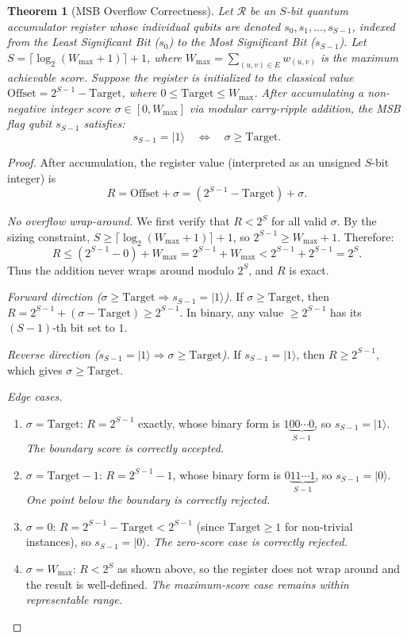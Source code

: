 \documentclass{ieeeaccess}
\newtheorem{theorem}{Theorem}
\begin{document}
\begin{theorem}[MSB Overflow Correctness]
\label{thm:overflow}
Let $\mathcal{R}$ be an $S$-bit quantum accumulator register whose individual qubits are denoted $s_0, s_1, \dots, s_{S-1}$, indexed from the Least Significant Bit ($s_0$) to the Most Significant Bit ($s_{S-1}$). Let $S = \lceil \log_2(W_{\max} + 1) \rceil + 1$, where $W_{\max} = \sum_{(u,v) \in E} w_{(u,v)}$ is the maximum achievable score. Suppose the register is initialized to the classical value $\mathrm{Offset} = 2^{S-1} - \mathrm{Target}$, where $0 \le \mathrm{Target} \le W_{\max}$. After accumulating a non-negative integer score $\sigma \in [0, W_{\max}]$ via modular carry-ripple addition, the MSB flag qubit $s_{S-1}$ satisfies:
\[
s_{S-1} = |1\rangle \quad \Longleftrightarrow \quad \sigma \ge \mathrm{Target}.
\]
\end{theorem}

\begin{proof}
After accumulation, the register value (interpreted as an unsigned $S$-bit integer) is
\[
R = \mathrm{Offset} + \sigma = (2^{S-1} - \mathrm{Target}) + \sigma.
\]

\textit{No overflow wrap-around.} We first verify that $R < 2^S$ for all valid $\sigma$. By the sizing constraint, $S \ge \lceil \log_2(W_{\max} + 1) \rceil + 1$, so $2^{S-1} \ge W_{\max} + 1$. Therefore:
\[
R \le (2^{S-1} - 0) + W_{\max} = 2^{S-1} + W_{\max} < 2^{S-1} + 2^{S-1} = 2^S.
\]
Thus the addition never wraps around modulo $2^S$, and $R$ is exact.

\textit{Forward direction ($\sigma \ge \mathrm{Target} \Rightarrow s_{S-1} = |1\rangle$).} If $\sigma \ge \mathrm{Target}$, then $R = 2^{S-1} + (\sigma - \mathrm{Target}) \ge 2^{S-1}$. In binary, any value $\ge 2^{S-1}$ has its $(S{-}1)$-th bit set to $1$.

\textit{Reverse direction ($s_{S-1} = |1\rangle \Rightarrow \sigma \ge \mathrm{Target}$).} If $s_{S-1} = |1\rangle$, then $R \ge 2^{S-1}$, which gives $\sigma \ge \mathrm{Target}$.


\textit{Edge cases.}
\begin{enumerate}
    \item[(i)] $\sigma = \mathrm{Target}$: $R = 2^{S-1}$ exactly, whose binary form is $1\underbrace{00\cdots0}_{S-1}$, so $s_{S-1} = |1\rangle$. \textit{The boundary score is correctly accepted.}
    \item[(ii)] $\sigma = \mathrm{Target} - 1$: $R = 2^{S-1} - 1$, whose binary form is $0\underbrace{11\cdots1}_{S-1}$, so $s_{S-1} = |0\rangle$. \textit{One point below the boundary is correctly rejected.}
    \item[(iii)] $\sigma = 0$: $R = 2^{S-1} - \mathrm{Target} < 2^{S-1}$ (since $\mathrm{Target} \ge 1$ for non-trivial instances), so $s_{S-1} = |0\rangle$. \textit{The zero-score case is correctly rejected.}
    \item[(iv)] $\sigma = W_{\max}$: $R < 2^S$ as shown above, so the register does not wrap around and the result is well-defined. \textit{The maximum-score case remains within representable range.}
\end{enumerate}
\end{proof}
\end{document}
